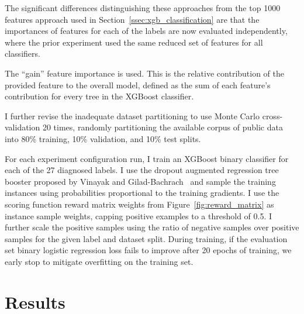 \documentclass[\main/thesis.tex]{subfiles}
\begin{document}
The significant differences distinguishing these approaches from the top 1000 features approach used in Section~\ref{ssec:xgb_classification} are that the importances of features for each of the labels are now evaluated independently, where the prior experiment used the same reduced set of features for all classifiers.

The ``gain'' feature importance is used.
This is the relative contribution of the provided feature to the overall model, defined as the sum of each feature's contribution for every tree in the XGBoost classifier.

I further revise the inadequate dataset partitioning to use Monte Carlo cross-validation 20 times, randomly partitioning the available corpus of public data into 80\% training, 10\% validation, and 10\% test splits.

For each experiment configuration run, I train an XGBoost binary classifier for each of the 27 diagnosed labels.
I use the dropout augmented regression tree booster proposed by Vinayak and Gilad-Bachrach~\cite{vinayak_dart_2015} and sample the training instances using probabilities proportional to the training gradients.
I use the scoring function reward matrix weights from Figure~\ref{fig:reward_matrix} as instance sample weights, capping positive examples to a threshold of 0.5.
I further scale the positive samples using the ratio of negative samples over positive samples for the given label and dataset split.
During training, if the evaluation set binary logistic regression loss fails to improve after 20 epochs of training, we early stop to mitigate overfitting on the training set.

\section{Results}
\label{sec:xgb_aenc_results}
\end{document}
